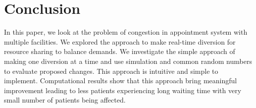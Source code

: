 \section{Conclusion}

In this paper, we look at the problem of congestion in appointment
system with multiple facilities. We explored the approach to make
real-time diversion for resource sharing to balance demands.
We investigate the simple approach of making one diversion at
a time and use simulation and common random numbers to evaluate
proposed changes. This approach is intuitive and simple to
implement. Computational results show that this approach bring
meaningful improvement leading to less patients experiencing
long waiting time with very small number of patients being affected.
